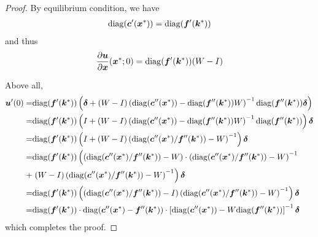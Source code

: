 \begin{proof}
By equilibrium condition, we have
\begin{align*}
    \mathrm{diag}({\bm{c}}'({\bm{x}}^*)) = \mathrm{diag}({\bm{f}}'({\bm{k}}^*))
\end{align*}
and thus
\begin{align*}
    \frac{\partial {\bm{u}}}{\partial {\bm{x}}}({\bm{x}}^*;0) = \mathrm{diag}({\bm{f}}'({\bm{k}}^*))(W - I)
\end{align*}

Above all,
\begin{align*}
    {\bm{u}}'(0) =& \mathrm{diag}({\bm{f}}'({\bm{k}}^*)) \left( \bm{\delta} + (W-I) \left( \mathrm{diag}({\bm{c}}''({\bm{x}}^*)) - \mathrm{diag}({\bm{f}}''({\bm{k}}^*))W \right)^{-1} \mathrm{diag}({\bm{f}}''({\bm{k}}^*)) \bm{\delta} \right)
    \\
    =& \mathrm{diag}({\bm{f}}'({\bm{k}}^*)) \left( I + (W-I) \left( \mathrm{diag}({\bm{c}}''({\bm{x}}^*)) - \mathrm{diag}({\bm{f}}''({\bm{k}}^*))W \right)^{-1} \mathrm{diag}({\bm{f}}''({\bm{k}}^*)) \right) \bm{\delta}
    \\
    =& \mathrm{diag}({\bm{f}}'({\bm{k}}^*)) \left( I + (W-I) \left( \mathrm{diag}({\bm{c}}''({\bm{x}}^*)/{\bm{f}}''({\bm{k}}^*)) - W \right)^{-1} \right) \bm{\delta}
    \\
    =& \mathrm{diag}({\bm{f}}'({\bm{k}}^*)) \left( \left( \mathrm{diag}({\bm{c}}''({\bm{x}}^*)/{\bm{f}}''({\bm{k}}^*)) - W \right)\cdot \left( \mathrm{diag}({\bm{c}}''({\bm{x}}^*)/{\bm{f}}''({\bm{k}}^*)) - W \right)^{-1}
    \right.
    \\
    +& \left. (W-I) \left( \mathrm{diag}({\bm{c}}''({\bm{x}}^*)/{\bm{f}}''({\bm{k}}^*)) - W \right)^{-1} \right) \bm{\delta}
    \\
    =& \mathrm{diag}({\bm{f}}'({\bm{k}}^*)) \left( (\mathrm{diag}({\bm{c}}''({\bm{x}}^*)/{\bm{f}}''({\bm{k}}^*))-I) \left( \mathrm{diag}({\bm{c}}''({\bm{x}}^*)/{\bm{f}}''({\bm{k}}^*)) - W \right)^{-1} \right) \bm{\delta}
    \\
    =& \mathrm{diag}({\bm{f}}'({\bm{k}}^*)) \cdot \mathrm{diag}({\bm{c}}''({\bm{x}}^*) - {\bm{f}}''({\bm{k}}^*)) \cdot \left[ \mathrm{diag}({\bm{c}}''({\bm{x}}^*)) - W \mathrm{diag}({\bm{f}}''({\bm{k}}^*)) \right]^{-1} \bm{\delta}
\end{align*}
which completes the proof.

\end{proof}